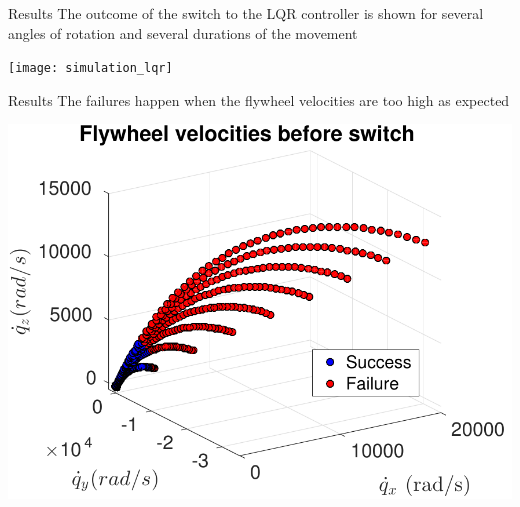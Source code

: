 \begin{frame}{Results}
  The outcome of the switch to the LQR controller
  is shown for several angles of rotation and several durations of the movement
  \par
  \centering
  \texttt{[image: simulation\_lqr]}
\end{frame}

\begin{frame}{Results}
  The failures happen when the flywheel velocities are too high as expected
  \par
  \centering
  \includegraphics[scale=0.62]{simulation_lqr_velocities}
\end{frame}

